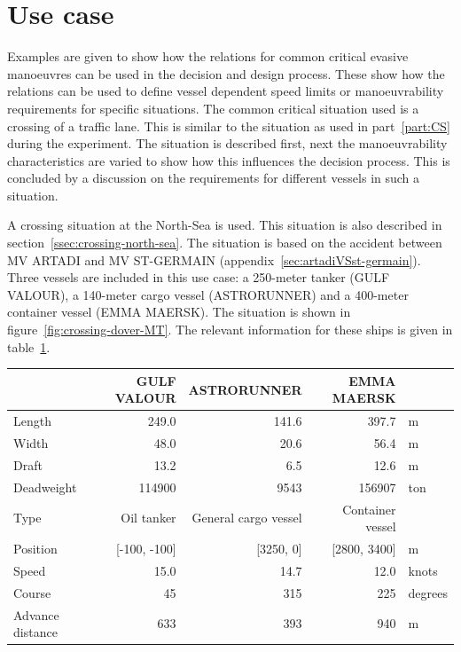 \section{Use case}
Examples are given to show how the relations for common critical evasive manoeuvres can be used in the decision and design process. These show how the relations can be used to define vessel dependent speed limits or manoeuvrability requirements for specific situations. The common critical situation used is a crossing of a traffic lane. This is similar to the situation as used in part~\ref{part:CS} during the experiment. The situation is described first, next the manoeuvrability characteristics are varied to show how this influences the decision process. This is concluded by a discussion on the requirements for different vessels in such a situation.

A crossing situation at the North-Sea is used. This situation is also described in section~\ref{ssec:crossing-north-sea}. The situation is based on the accident between MV ARTADI and MV ST-GERMAIN (appendix~\ref{sec:artadiVSst-germain}). Three vessels are included in this use case: a 250-meter tanker (GULF VALOUR), a 140-meter cargo vessel (ASTRORUNNER) and a 400-meter container vessel (EMMA MAERSK). The situation is shown in figure~\ref{fig:crossing-dover-MT}. The relevant information for these ships is given in table~\ref{tab:info-dover-MT}.

\begin{table}[p]
	\centering
	\begin{tabular}{l | r r r l}
		\toprule
		& GULF VALOUR & ASTRORUNNER & EMMA MAERSK & \\
		\midrule
		Length     & 249.0    & 141.6    &  397.7 & m \\
		Width     & 48.0    & 20.6    &  56.4 & m  \\
		Draft     & 13.2    & 6.5    &  12.6 & m  \\
		Deadweight & 114900 & 9543 & 156907 & ton \\
		Type     & Oil tanker    & General cargo vessel    &  Container vessel & \\
		\midrule
		Position& [-100, -100]    & [3250, 0]    &  [2800, 3400] & m \\
		Speed     & 15.0    & 14.7    &  12.0 & knots\\
		Course     & 45    & 315    &  225 & degrees \\
		Advance distance & 633 & 393 & 940 & m \\
		\bottomrule
	\end{tabular}
	\label{tab:info-dover-MT}
\end{table}

